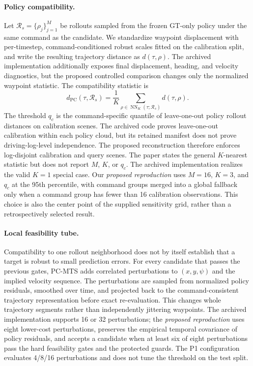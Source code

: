 \paragraph{Policy compatibility.}
Let $\mathcal R_s=\{\rho_j\}_{j=1}^{M}$ be rollouts sampled from the frozen
GT-only policy under the same command as the candidate.  We standardize
waypoint displacement with per-timestep, command-conditioned robust scales
fitted on the calibration split, and write the resulting trajectory distance
as $d(\tau,\rho)$.  The archived implementation additionally exposes final
displacement, heading, and velocity diagnostics, but the proposed controlled
comparison changes only the normalized waypoint statistic.  The compatibility
statistic is
\begin{equation}
 d_{\mathrm{PC}}(\tau,\mathcal R_s)
 =\frac{1}{K}\sum_{\rho\in\operatorname{NN}_{K}(\tau;\mathcal R_s)}
 d(\tau,\rho).
\end{equation}
The threshold $q_c$ is the command-specific quantile of leave-one-out policy
rollout distances on calibration scenes.  The archived code proves
leave-one-out calibration within each policy cloud, but its retained manifest
does not prove driving-log-level independence.  The proposed reconstruction
therefore enforces log-disjoint calibration and query scenes.  The paper states the general
$K$-nearest statistic but does not report $M$, $K$, or $q_c$.  The archived
implementation realizes the valid $K=1$ special case.  Our \emph{proposed
reproduction} uses $M=16$, $K=3$, and $q_c$ at the 95th percentile, with
command groups merged into a global fallback only when a command group has
fewer than 16 calibration observations.  This choice is also the center point
of the supplied sensitivity grid, rather than a retrospectively selected
result.

\paragraph{Local feasibility tube.}
Compatibility to one rollout neighborhood does not by itself establish that a
target is robust to small prediction errors.  For every candidate that passes
the previous gates, PC-MTS adds correlated perturbations to $(x,y,\psi)$ and
the implied velocity sequence.  The perturbations are sampled from normalized
policy residuals, smoothed over time, and projected back to the command-consistent
trajectory representation before exact re-evaluation.  This changes whole
trajectory segments rather than independently jittering waypoints.  The
archived implementation supports 16 or 32 perturbations; the \emph{proposed
reproduction} uses eight lower-cost perturbations, preserves the empirical
temporal covariance of policy residuals, and accepts a candidate when at least
six of eight perturbations pass
the hard feasibility gates and the protected guards.  The P1 configuration
evaluates 4/8/16 perturbations and does not tune the threshold on the test
split.

